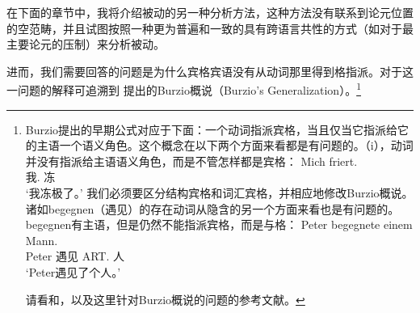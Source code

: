在下面的章节中，我将介绍被动的另一种分析方法，这种方法没有联系到论元位置的空范畴，并且试图按照一种更为普遍和一致的具有跨语言共性的方式（如对于最主要论元的压制）来分析被动。

进而，我们需要回答的问题是为什么宾格宾语没有从动词那里得到格指派。对于这一问题的解释可追溯到\citet[--185]{Burzio86a-u-gekauft} 提出的Burzio概说（Burzio's Generalization）。\footnote{
Burzio提出的早期公式对应于下面：一个动词指派宾格，当且仅当它指派给它的主语一个语义角色。这个概念在以下两个方面来看都是有问题的。（i），动词并没有指派给主语语义角色，而是不管怎样都是宾格：
\ea
\gll Mich friert.\\
	 我.\acc{} 冻\\
\glt `我冻极了。'
\z
我们必须要区分结构宾格和词汇宾格，并相应地修改Burzio概说。诸如begegnen（遇见）的存在动词从隐含的另一个方面来看也是有问题的。begegnen有主语，但是仍然不能指派宾格，而是与格：
\ea
\gll Peter begegnete einem Mann.\\
     Peter 遇见 ART.\dat{} 人\\
\glt `Peter遇见了个人。'
\z

请看和，以及这里针对Burzio概说的问题的参考文献。
}
